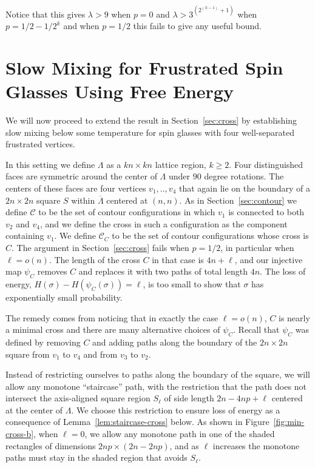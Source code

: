 \documentclass[letterpaper,english,numberwithinsect]{amsart}
\newcommand{\cC}{\mathcal{C}}
\begin{document}
\noindent Notice that this gives $\lambda > 9$ when $p=0$ and $\lambda > 3^{(2^{(k-1)}+1)}$
 when $p=1/2-1/2^k$ and
 when $p=1/2$ this fails to give any useful bound.





\section{Slow Mixing for Frustrated Spin Glasses Using Free Energy}\label{sec:slow}
We will now proceed to extend the result in Section~\ref{sec:cross} by establishing slow mixing below some temperature for spin glasses with four well-separated frustrated vertices.   

In this setting we define $\Lambda$ as a $kn \times kn$ lattice region, $k \geq 2$. 
Four distinguished faces are symmetric around the center of $\Lambda$ under $90$ degree rotations. The centers of these faces are four vertices $v_1,..,v_4$ that again lie on the boundary of a $2n \times 2n$ square $S$ within $\overline{\Lambda}$ centered at $(n, n)$. 
As in Section~\ref{sec:contour} we define $\cC$ to be the set of contour configurations in which $v_1$ is connected to both $v_2$ and $v_4$, and we define the cross in such a configuration as the component containing $v_1$. 
We define $\cC_C$ to be the set of contour configurations whose cross is $C$.
The argument in Section~\ref{sec:cross} fails when $p = 1/2$, in particular when $\ell = o(n)$.
The length of the cross $C$ in that case is $4n + \ell$,  
and our injective map $\psi_C$ removes $C$ and replaces it with two paths of total length $4n$. 
The loss of energy, $H(\sigma) - H(\psi_C(\sigma)) = \ell$, is too small to show that $\sigma$ has exponentially small probability.

The remedy comes from noticing that in exactly the case $\ell = o(n)$, $C$ is nearly a minimal cross 
and there are many alternative choices of $\psi_C$. Recall that $\psi_C$ was defined by removing $C$ and adding paths along the boundary of the $2n\times 2n$ square from $v_1$ to $v_4$ and from $v_3$ to $v_2$.

Instead of restricting ourselves to paths along the boundary of the square, we will allow any monotone ``staircase'' path, with the restriction that the path does not intersect the axis-aligned square region $S_{\ell}$ of side length $2n - 4np + \ell$ centered at the center of $\Lambda$.  
We choose this restriction to ensure loss of energy as a consequence of Lemma~\ref{lem:staircase-cross} below. 
As shown in Figure~\ref{fig:min-cross-b}, when $\ell=0$, we allow any monotone path in one of the shaded rectangles of dimensions $2np\times (2n-2np)$, and as $\ell$ increases the monotone paths must stay in the shaded region that avoids $S_{\ell}$.
\end{document}
